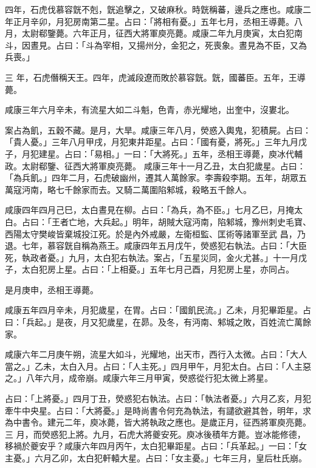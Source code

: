 \begin{pinyinscope}
 四年，石虎伐慕容皝不剋，皝追擊之，又破麻秋。時皝稱蕃，邊兵之應也。咸康二年正月辛卯，月犯房南第二星。占曰：「將相有憂。」五年七月，丞相王導薨。八月，太尉郗鑒薨。六年正月，征西大將軍庾亮薨。咸康二年九月庚寅，太白犯南斗，因晝見。占曰：「斗為宰相，又揚州分，金犯之，死喪象。晝見為不臣，又為兵喪。」



 三
 年，石虎僭稱天王。四年，虎滅段遼而敗於慕容皝。皝，國蕃臣。五年，王導薨。



 咸康三年六月辛未，有流星大如二斗魁，色青，赤光耀地，出奎中，沒婁北。



 案占為飢，五穀不藏。是月，大旱。咸康三年八月，熒惑入輿鬼，犯積屍。占曰：「貴人憂。」三年八月甲戌，月犯東井距星。占曰：「國有憂，將死。」三年九月戊子，月犯建星。占曰：「易相。」一曰：「大將死。」五年，丞相王導薨，庾冰代輔政。太尉郗鑒、征西大將軍庾亮薨。
 咸康三年十一月乙丑，太白犯歲星。占曰：「為兵飢。」四年二月，石虎破幽州，遷其人萬餘家。李壽殺李期。五年，胡眾五萬寇沔南，略七千餘家而去。又騎二萬圍陷邾城，殺略五千餘人。



 咸康四年四月己巳，太白晝見在柳。占曰：「為兵，為不臣。」七月乙巳，月掩太白。占曰：「王者亡地，大兵起。」明年，胡賊大寇沔南，陷邾城，豫州刺史毛寶、西陽太守樊峻皆棄城投江死。於是內外戒嚴，左衛桓監、匡術等諸軍至武
 昌，乃退。七年，慕容皝自稱為燕王。咸康四年五月戊午，熒惑犯右執法。占曰：「大臣死，執政者憂。」九月，太白犯右執法。案占，「五星災同，金火尤甚。」十一月戊子，太白犯房上星。占曰：「上相憂。」五年七月己酉，月犯房上星，亦同占。



 是月庚申，丞相王導薨。



 咸康五年四月辛未，月犯歲星，在胃。占曰：「國飢民流。」乙未，月犯畢距星。占曰：「兵起。」是夜，月又犯歲星，在昴。及冬，有沔南、邾城之敗，百姓流亡萬餘家。



 咸康六年二月庚午朔，流星大如斗，光耀地，出天市，西行入太微。占曰：「大人當之。」乙未，太白入月。占曰：「人主死。」四月甲午，月犯太白。占曰：「人主惡之。」八年六月，成帝崩。咸康六年三月甲寅，熒惑從行犯太微上將星。



 占曰：「上將憂。」四月丁丑，熒惑犯右執法。占曰：「執法者憂。」六月乙亥，月犯牽牛中央星。占曰：「大將憂。」是時尚書令何充為執法，有譴欲避其咎，明年，求為中書令。建元二年，庾冰薨，皆大將執政之應也。是歲正月，征西將軍庾亮薨。三
 月，而熒惑犯上將。九月，石虎大將夔安死。庾冰後積年方薨。豈冰能修德，移禍於夔安乎？咸康六年四月丙午，太白犯畢距星。占曰：「兵革起。」一曰：「女主憂。」六月乙卯，太白犯軒轅大星。占曰：「女主憂。」七年三月，皇后杜氏崩。




\end{pinyinscope}
